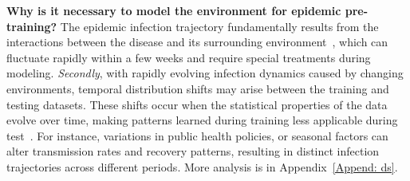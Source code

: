 
\textbf{Why is it necessary to model the environment for epidemic pre-training?} 
The epidemic infection trajectory fundamentally results from the interactions between the disease and its surrounding environment~\cite{jutla2013environmental}, which can fluctuate rapidly within a few weeks and require special treatments during modeling.  \textit{Secondly}, with rapidly evolving infection dynamics caused by changing environments, temporal distribution shifts may arise between the training and testing datasets. These shifts occur when the statistical properties of the data evolve over time, making patterns learned during training less applicable during test~\cite{chen2024calibration, zhang2022dynamic}. For instance, variations in public health policies, or seasonal factors can alter transmission rates and recovery patterns, resulting in distinct infection trajectories across different periods. More analysis is in Appendix~\ref{Append: ds}.



